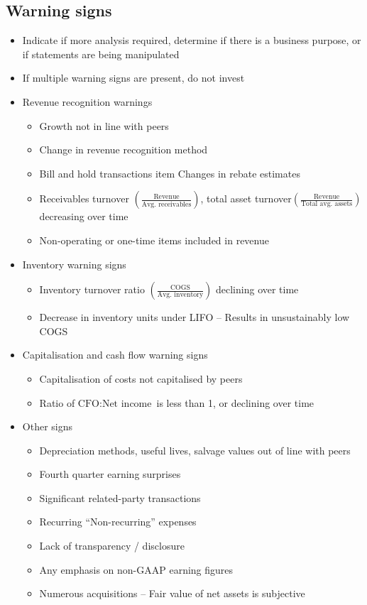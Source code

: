 \documentclass[../notes_compiled.tex]{subfiles}
\begin{document}
\subsection{Warning signs}
\begin{itemize}
\item Indicate if more analysis required, determine if there is a business purpose, or if statements are being manipulated
\item If multiple warning signs are present, do not invest
\item Revenue recognition warnings 
\begin{itemize}
\item Growth not in line with peers
\item Change in revenue recognition method
\item Bill and hold transactions
item Changes in rebate estimates
\item Receivables turnover $\left( \frac{\text{Revenue}}{\text{Avg. receivables}}\right)$, total asset turnover$\left( \frac{\text{Revenue}}{\text{Total avg. assets}}\right)$ decreasing over time
\item Non-operating or one-time items included in revenue
\end{itemize}

\item Inventory warning signs
\begin{itemize}
\item Inventory turnover ratio $\left(\frac{\text{COGS}}{\text{Avg. inventory}}\right)$ declining over time
\item Decrease in inventory units under LIFO -- Results in unsustainably low COGS
\end{itemize}

\item Capitalisation and cash flow warning signs
\begin{itemize}
\item Capitalisation of costs not capitalised by peers
\item Ratio of $\text{CFO}:\text{Net income}$ is less than 1, or declining over time
\end{itemize}

\item Other signs
\begin{itemize}
\item Depreciation methods, useful lives, salvage values out of line with peers
\item Fourth quarter earning surprises
\item Significant related-party transactions
\item Recurring ``Non-recurring'' expenses
\item Lack of transparency / disclosure
\item Any emphasis on non-GAAP earning figures
\item Numerous acquisitions -- Fair value of net assets is subjective
\end{itemize}

\end{itemize}
\end{document}
